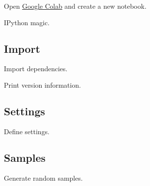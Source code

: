 \documentclass[aspectratio=169]{beamer}
\begin{document}
\begin{frame}
    \par Open \href{https://colab.research.google.com/}{Google Colab} and create a new notebook.
    \begin{listing}[H]
        \caption{IPython magic.}
        \label{lst:tflite:sinewave:magic}
    \end{listing}
\end{frame}

\subsection{Import}

\begin{frame}
    \begin{listing}[H]
        \caption{Import dependencies.}
        \label{lst:tflite:sinewave:import}
    \end{listing}
    \begin{listing}[H]
        \caption{Print version information.}
        \label{lst:tflite:sinewave:version}
    \end{listing}
\end{frame}

\subsection{Settings}

\begin{frame}
    \begin{listing}[H]
        \caption{Define settings.}
        \label{lst:tflite:sinewave:settings}
    \end{listing}
\end{frame}

\subsection{Samples}

\begin{frame}
    \begin{listing}[H]
        \caption{Generate random samples.}
        \label{lst:tflite:sinewave:generate_samples}
    \end{listing}
\end{frame}
\end{document}
